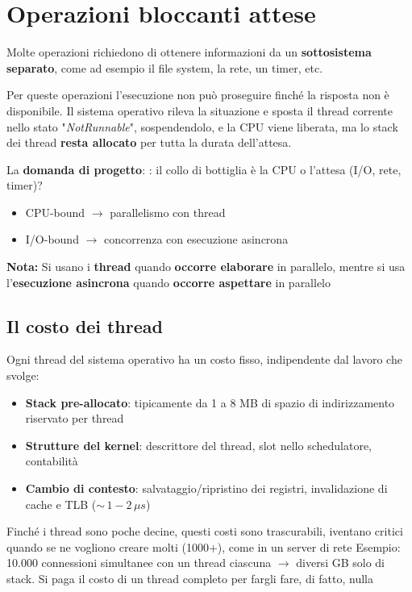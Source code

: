 \section{Operazioni bloccanti attese}

Molte operazioni richiedono di ottenere informazioni da un \textbf{sottosistema separato}, come ad esempio
il file system, la rete, un timer, etc.

Per queste operazioni l'esecuzione non può proseguire finché la risposta non è disponibile.
Il sistema operativo rileva la situazione e sposta il thread corrente nello stato
"\textit{NotRunnable}", sospendendolo, e la CPU viene liberata, ma lo stack dei thread
\textbf{resta allocato} per tutta la durata dell'attesa.

La \textbf{domanda di progetto}: : il collo di bottiglia è la CPU o l'attesa (I/O, rete, timer)?

\begin{itemize}
  \item CPU-bound $\rightarrow$ parallelismo con thread
  \item I/O-bound $\rightarrow$ concorrenza con esecuzione asincrona
\end{itemize}


\begin{tcolorbox}
  \textbf{Nota:} Si usano i \textbf{thread} quando \textbf{occorre elaborare} in
  parallelo, mentre si usa l'\textbf{esecuzione asincrona}
  quando \textbf{occorre aspettare} in parallelo
\end{tcolorbox}

\subsection{Il costo dei thread}

Ogni thread del sistema operativo ha un costo fisso, indipendente dal lavoro che
svolge:

\begin{itemize}
  \item \textbf{Stack pre-allocato}: tipicamente da 1 a 8 MB di spazio di indirizzamento riservato per thread
  \item \textbf{Strutture del kernel}: descrittore del thread, slot nello schedulatore, contabilità
  \item \textbf{Cambio di contesto}: salvataggio/ripristino dei registri, invalidazione di cache e TLB ($\sim\,1-2\,\mu s$)
\end{itemize}

Finché i thread sono poche decine, questi costi sono trascurabili, iventano
critici quando se ne vogliono creare molti (1000+), come in un server di rete
Esempio: 10.000 connessioni simultanee con un thread ciascuna \(\to \) diversi
GB solo di stack.
Si paga il costo di un thread completo per fargli fare, di fatto, nulla



